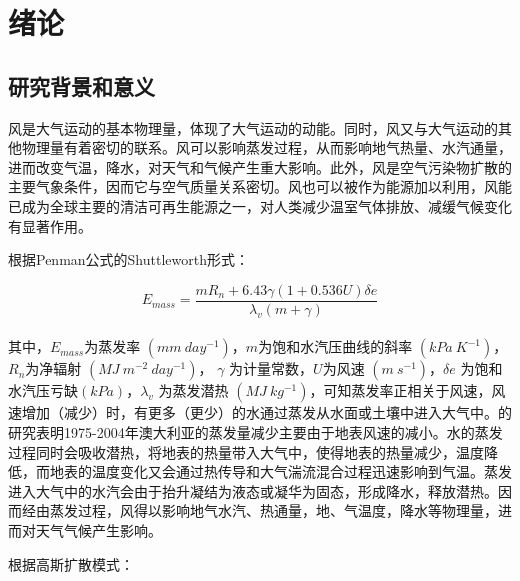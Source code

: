 
\chapter{绪论}\label{chap:intro}

\section{研究背景和意义}

风是大气运动的基本物理量，体现了大气运动的动能。同时，风又与大气运动的其他物理量有着密切的联系。风可以影响蒸发过程，从而影响地气热量、水汽通量，进而改变气温，降水，对天气和气候产生重大影响。此外，风是空气污染物扩散的主要气象条件，因而它与空气质量关系密切。风也可以被作为能源加以利用，风能已成为全球主要的清洁可再生能源之一，对人类减少温室气体排放、减缓气候变化有显著作用。

根据Penman公式的Shuttleworth形式\citep{shuttleworth1993evaporation}：

\begin{equation} \label{eq:penman}
E_{mass} = \frac{mR_{n} + 6.43 \gamma \left( 1 + 0.536 U \right) \delta e }{\lambda_{v} \left(m + \gamma \right)}
\end{equation} ~\\
其中，$E_{mass}$为蒸发率 $(mm ~ day^{-1})$，$m$为饱和水汽压曲线的斜率 $(kPa ~ K^{-1})$，$R_{n}$为净辐射 $(MJ ~ m^{-2} ~ day^{-1})$， $\gamma$ 为计量常数，$U$为风速 $(m ~ s^{-1})$，$\delta e$ 为饱和水汽压亏缺$ (kPa)$，$\lambda_{v} $ 为蒸发潜热 $(MJ ~ kg^{−1})$，可知蒸发率正相关于风速，风速增加（减少）时，有更多（更少）的水通过蒸发从水面或土壤中进入大气中。\citet{roderick2007attribution}的研究表明1975-2004年澳大利亚的蒸发量减少主要由于地表风速的减小。水的蒸发过程同时会吸收潜热，将地表的热量带入大气中，使得地表的热量减少，温度降低，而地表的温度变化又会通过热传导和大气湍流混合过程迅速影响到气温。蒸发进入大气中的水汽会由于抬升凝结为液态或凝华为固态，形成降水，释放潜热。因而经由蒸发过程，风得以影响地气水汽、热通量，地、气温度，降水等物理量，进而对天气气候产生影响。

根据高斯扩散模式\citep{beychok2005fundamentals}：

